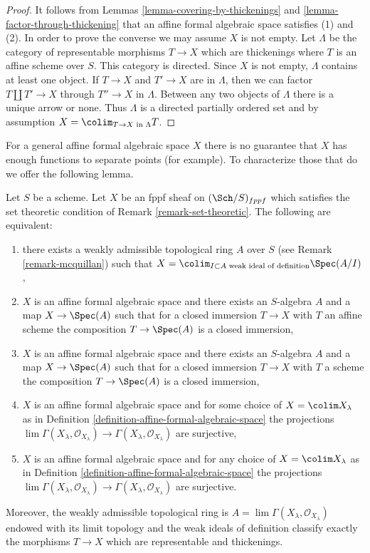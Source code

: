 \begin{proof}
It follows from Lemmas \ref{lemma-covering-by-thickenings} and
\ref{lemma-factor-through-thickening} that an affine formal algebraic space
satisfies (1) and (2). In order to prove the converse we may
assume $X$ is not empty.
Let $\Lambda$ be the category of representable morphisms $T \to X$ which are
thickenings where $T$ is an affine scheme over $S$. This category
is directed. Since $X$ is not empty, $\Lambda$ contains at least one
object. If $T \to X$ and $T' \to X$ are in $\Lambda$, then we can
factor $T \amalg T' \to X$ through $T'' \to X$ in $\Lambda$. Between
any two objects of $\Lambda$ there is a unique arrow or none. Thus
$\Lambda$ is a directed partially ordered set and by assumption
$X = \colim_{T \to X\text{ in }\Lambda} T$.
\end{proof}

\noindent
For a general affine formal algebraic space $X$ there is no guarantee
that $X$ has enough functions to separate points (for example).
To characterize those that do we offer the following lemma.

\begin{lemma}
\label{lemma-mcquillan-affine-formal-algebraic-space}
Let $S$ be a scheme. Let $X$ be an fppf sheaf on $(\Sch/S)_{fppf}$
which satisfies the set theoretic condition of
Remark \ref{remark-set-theoretic}.
The following are equivalent:
\begin{enumerate}
\item there exists a weakly admissible topological ring $A$ over $S$
(see Remark \ref{remark-mcquillan}) such that
$X = \colim_{I \subset A\text{ weak ideal of definition}} \Spec(A/I)$,
\item $X$ is an affine formal algebraic space and
there exists an $S$-algebra $A$ and a map $X \to \Spec(A)$
such that for a closed immersion $T \to X$ with $T$ an affine scheme
the composition $T \to \Spec(A)$ is a closed immersion,
\item $X$ is an affine formal algebraic space and
there exists an $S$-algebra $A$ and a map $X \to \Spec(A)$
such that for a closed immersion $T \to X$ with $T$ a scheme
the composition $T \to \Spec(A)$ is a closed immersion,
\item $X$ is an affine formal algebraic space and
for some choice of $X = \colim X_\lambda$ as in
Definition \ref{definition-affine-formal-algebraic-space}
the projections $\lim \Gamma(X_\lambda, \mathcal{O}_{X_\lambda})
\to \Gamma(X_\lambda, \mathcal{O}_{X_\lambda})$ are surjective,
\item $X$ is an affine formal algebraic space and for any choice
of $X = \colim X_\lambda$ as in
Definition \ref{definition-affine-formal-algebraic-space}
the projections $\lim \Gamma(X_\lambda, \mathcal{O}_{X_\lambda})
\to \Gamma(X_\lambda, \mathcal{O}_{X_\lambda})$ are surjective.
\end{enumerate}
Moreover, the weakly admissible topological ring is
$A = \lim \Gamma(X_\lambda, \mathcal{O}_{X_\lambda})$
endowed with its limit topology and the weak ideals of definition
classify exactly the morphisms $T \to X$ which are representable
and thickenings.
\end{lemma}

